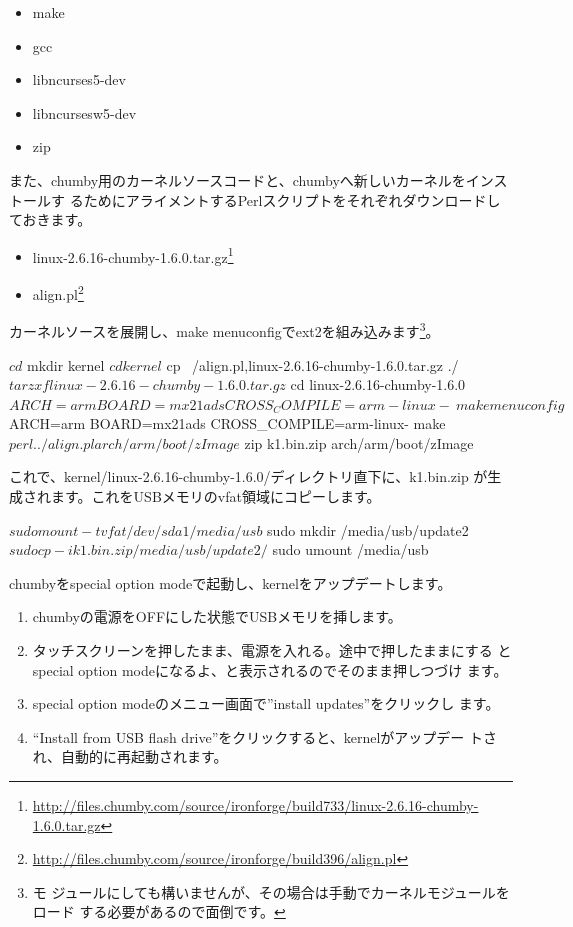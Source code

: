 \documentclass[mingoth,a4paper]{jsarticle}
\begin{document}
\begin{multicols}{2}
\begin{itemize}
\item make
\item gcc
\item libncurses5-dev
\item libncursesw5-dev
\item zip
\end{itemize}
また、chumby用のカーネルソースコードと、chumbyへ新しいカーネルをインストールす
るためにアライメントするPerlスクリプトをそれぞれダウンロードしておきます。
\begin{itemize}
\item linux-2.6.16-chumby-1.6.0.tar.gz\footnote{\url{http://files.chumby.com/source/ironforge/build733/linux-2.6.16-chumby-1.6.0.tar.gz}}
\item align.pl\footnote{\url{http://files.chumby.com/source/ironforge/build396/align.pl}}
\end{itemize}

カーネルソースを展開し、make menuconfigでext2を組み込みます\footnote{モ
ジュールにしても構いませんが、その場合は手動でカーネルモジュールをロード
する必要があるので面倒です。}。
\begin{commandline}
$ cd
$ mkdir kernel
$ cd kernel
$ cp ~/{align.pl,linux-2.6.16-chumby-1.6.0.tar.gz} ./
$ tar zxf linux-2.6.16-chumby-1.6.0.tar.gz
$ cd linux-2.6.16-chumby-1.6.0
$ ARCH=arm BOARD=mx21ads CROSS_COMPILE=arm-linux- \
 make menuconfig
$ ARCH=arm BOARD=mx21ads CROSS_COMPILE=arm-linux- make
$ perl ../align.pl arch/arm/boot/zImage
$ zip k1.bin.zip arch/arm/boot/zImage
\end{commandline}
これで、kernel/linux-2.6.16-chumby-1.6.0/ディレクトリ直下に、k1.bin.zip
が生成されます。これをUSBメモリのvfat領域にコピーします。
\begin{commandline}
$ sudo mount -t vfat /dev/sda1 /media/usb
$ sudo mkdir /media/usb/update2
$ sudo cp -i k1.bin.zip /media/usb/update2/
$ sudo umount /media/usb
\end{commandline}
chumbyをspecial option modeで起動し、kernelをアップデートします。
\begin{enumerate}
\item chumbyの電源をOFFにした状態でUSBメモリを挿します。
\item タッチスクリーンを押したまま、電源を入れる。途中で押したままにする
      とspecial option modeになるよ、と表示されるのでそのまま押しつづけ
      ます。
\item special option modeのメニュー画面で''install updates''をクリックし
      ます。
\item ``Install from USB flash drive''をクリックすると、kernelがアップデー
      トされ、自動的に再起動されます。
\end{enumerate}

\end{multicols}
\end{document}

